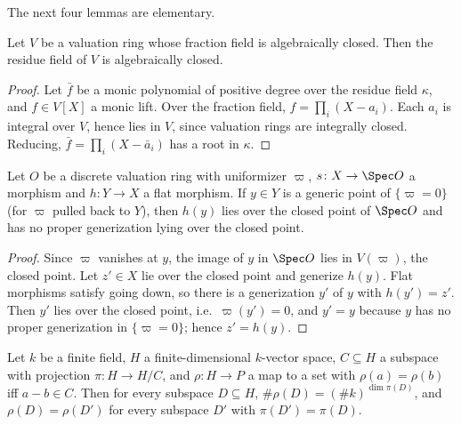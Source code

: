 The next four lemmas are elementary.

\begin{lemma}\label{pf:ks2:resclosed}
Let $V$ be a valuation ring whose fraction field is algebraically closed. Then the residue field of
$V$ is algebraically closed.
\end{lemma}

\begin{proof}
Let $\bar f$ be a monic polynomial of positive degree over the residue field $\kappa$, and $f\in V[X]$
a monic lift. Over the fraction field, $f=\prod_i(X-a_i)$. Each $a_i$ is integral over $V$, hence lies
in $V$, since valuation rings are integrally closed. Reducing, $\bar f=\prod_i(X-\bar a_i)$ has a root
in $\kappa$.
\end{proof}

\begin{lemma}\label{pf:ks2:gendown}
Let $O$ be a discrete valuation ring with uniformizer $\varpi$, $s\colon X\to\Spec O$ a morphism and
$h\colon Y\to X$ a flat morphism. If $y\in Y$ is a generic point of $\{\varpi=0\}$ (for $\varpi$ pulled
back to $Y$), then $h(y)$ lies over the closed point of $\Spec O$ and has no proper generization lying
over the closed point.
\end{lemma}

\begin{proof}
Since $\varpi$ vanishes at $y$, the image of $y$ in $\Spec O$ lies in $V(\varpi)$, the closed point.
Let $z'\in X$ lie over the closed point and generize $h(y)$. Flat morphisms satisfy going down, so
there is a generization $y'$ of $y$ with $h(y')=z'$. Then $y'$ lies over the closed point, i.e.\
$\varpi(y')=0$, and $y'=y$ because $y$ has no proper generization in $\{\varpi=0\}$; hence $z'=h(y)$.
\end{proof}

\begin{lemma}[Reduction of a subspace]\label{pf:ks2:redpts}
Let $k$ be a finite field, $H$ a finite-dimensional $k$-vector space, $C\subseteq H$ a subspace with
projection $\pi\colon H\to H/C$, and $\rho\colon H\to P$ a map to a set with $\rho(a)=\rho(b)$ iff
$a-b\in C$. Then for every subspace $D\subseteq H$, $\#\rho(D)=(\#k)^{\dim\pi(D)}$, and
$\rho(D)=\rho(D')$ for every subspace $D'$ with $\pi(D')=\pi(D)$.
\end{lemma}

